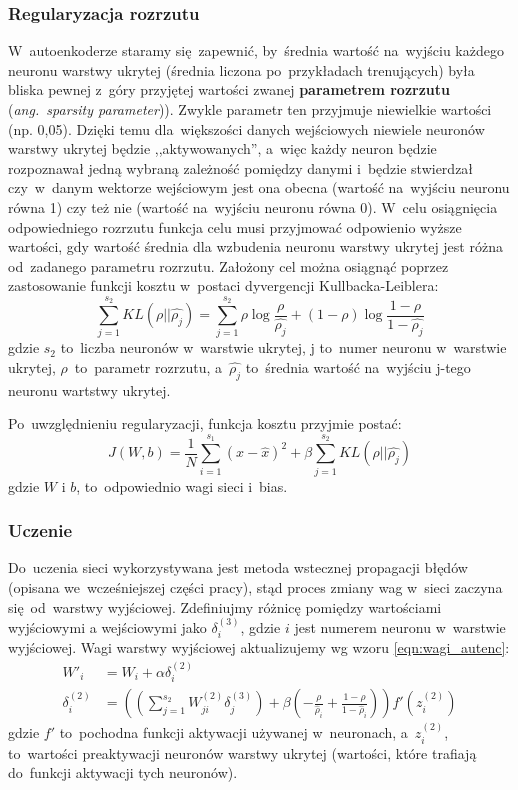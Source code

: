 \subsubsection{Regularyzacja rozrzutu}
W~autoenkoderze staramy się~zapewnić, by~średnia wartość na~wyjściu każdego neuronu warstwy ukrytej
(średnia liczona po~przykładach trenujących) była bliska pewnej z~góry przyjętej wartości zwanej \textbf{parametrem
rozrzutu} (\textit{ang.~sparsity parameter})). Zwykle parametr ten przyjmuje niewielkie wartości (np. 0,05). Dzięki temu
dla~większości danych wejściowych niewiele neuronów warstwy ukrytej będzie ,,aktywowanych'', a~więc każdy neuron będzie
rozpoznawał jedną wybraną zależność pomiędzy danymi i~będzie stwierdzał czy~w~danym wektorze wejściowym jest ona obecna
(wartość na~wyjściu neuronu równa 1) czy też nie (wartość na~wyjściu neuronu równa 0). W~celu osiągnięcia odpowiedniego
rozrzutu funkcja celu musi przyjmować odpowienio wyższe wartości, gdy wartość średnia dla wzbudenia neuronu warstwy
ukrytej jest różna od~zadanego parametru rozrzutu. Założony cel można osiągnąć poprzez zastosowanie funkcji kosztu
w~postaci dyvergencji Kullbacka-Leiblera:
\begin{equation*}
\sum\limits_{j=1}^{s_2}KL(\rho||\hat{\rho_j}) = \sum\limits_{j=1}^{s_2}\rho \log\frac{\rho}{\hat{\rho_j}} +
(1-\rho)\log\frac{1-\rho}{1-\hat{\rho_j}}
\end{equation*}
gdzie $s_2$ to~liczba neuronów w~warstwie ukrytej, j to~numer neuronu w~warstwie ukrytej, $\rho$~to~parametr rozrzutu,
a~$\hat{\rho_j}$ to~średnia wartość na~wyjściu j-tego neuronu wartstwy ukrytej.

Po~uwzględnieniu regularyzacji, funkcja kosztu przyjmie postać:
\begin{equation*}
J(W,b)=\frac{1}{N}\sum\limits_{i=1}^{s_1}(x-\hat{x})^2 + \beta\sum\limits_{j=1}^{s_2}KL(\rho||\hat{\rho_j})
\end{equation*}
gdzie $W$ i $b$, to~odpowiednio wagi sieci i~bias.

\subsubsection{Uczenie}
Do~uczenia sieci wykorzystywana jest metoda wstecznej propagacji błędów (opisana we~wcześniejszej części pracy),
stąd proces zmiany wag w~sieci zaczyna się~od~warstwy wyjściowej. Zdefiniujmy różnicę pomiędzy wartościami wyjściowymi
a wejściowymi jako $\delta_i^{(3)}$, gdzie $i$ jest numerem neuronu w~warstwie wyjściowej.
Wagi warstwy wyjściowej aktualizujemy wg wzoru \ref{eqn:wagi_autenc}:
\begin{equation}
    \begin{split}
    W'_i &= W_i + \alpha\delta^{(2)}_i \\
    \delta_i^{(2)} &= \left( \left( \sum\limits_{j=1}^{s_{2}} W^{(2)}_{ji} \delta^{(3)}_j \right)
    + \beta \left( - \frac{\rho}{\hat\rho_i} + \frac{1-\rho}{1-\hat\rho_i} \right) \right) f'(z^{(2)}_i)
    \end{split}
    \label{eqn:wagi_autenc}
\end{equation}
gdzie $f'$ to~pochodna funkcji aktywacji używanej w~neuronach, a~$z^{(2)}_i$, to~wartości preaktywacji neuronów warstwy
ukrytej (wartości, które trafiają do~funkcji aktywacji tych neuronów).

